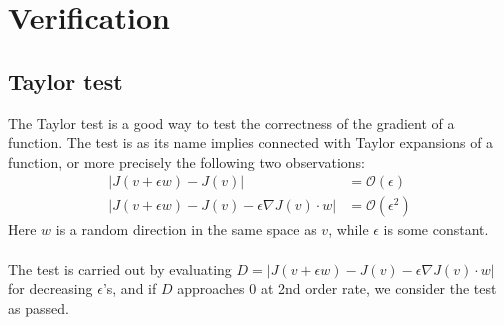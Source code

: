\chapter{Verification}\label{Verification chapter}
\section{Taylor test}
The Taylor test is a good way to test the correctness of the gradient of a function. The test is as its name implies connected with Taylor expansions of a function, or more precisely the following two observations:
\begin{align*}
|J(v+\epsilon w)-J(v)| &= \mathcal{O}(\epsilon) \\
|J(v+\epsilon w)-J(v)-\epsilon\nabla J(v)\cdot w| &= \mathcal{O}(\epsilon^2)
\end{align*}
Here $w$ is a random direction in the same space as $v$, while $\epsilon$ is some constant. 
\\
\\
The test is carried out by evaluating $D=|J(v+\epsilon w)-J(v)-\epsilon\nabla J(v)\cdot w|$ for decreasing $\epsilon$'s, and if $D$ approaches 0 at 2nd order rate, we consider the test as passed.
